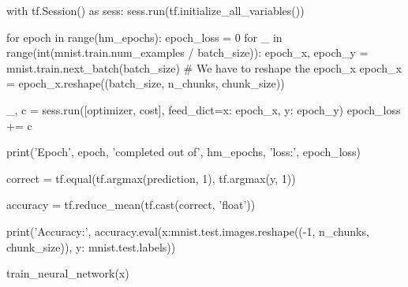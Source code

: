\documentclass[11pt]{article}
\begin{document}
\begin{python}
    with tf.Session() as sess:
        sess.run(tf.initialize_all_variables())

        for epoch in range(hm_epochs):
            epoch_loss = 0
            for _ in range(int(mnist.train.num_examples / batch_size)):
                epoch_x, epoch_y = mnist.train.next_batch(batch_size)
                # We have to reshape the epoch_x
                epoch_x = epoch_x.reshape((batch_size,
                                           n_chunks, chunk_size))

                _, c = sess.run([optimizer, cost],
                                feed_dict={x: epoch_x, y: epoch_y})
                epoch_loss += c

            print('Epoch', epoch, 'completed out of', hm_epochs,
                  'loss:', epoch_loss)

        correct = tf.equal(tf.argmax(prediction, 1), tf.argmax(y, 1))

        accuracy = tf.reduce_mean(tf.cast(correct, 'float'))
        
        print('Accuracy:',
              accuracy.eval({x:mnist.test.images.reshape((-1, n_chunks,
                                                          chunk_size)),
                             y: mnist.test.labels}))
                             
                             
train_neural_network(x)                             
\end{python}{}
\clearpage
\end{document}

